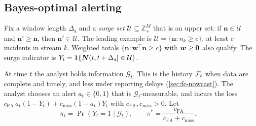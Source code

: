 \subsection{Bayes-optimal alerting}\label{sec:fc-alert}

Fix a window length $\Delta_{\mathrm a}$ and a \emph{surge set} $\mathcal U\subseteq\mathbb Z_+^M$
that is an upper set: if $\bm n\in\mathcal U$ and $\bm n'\ge\bm n$, then
$\bm n'\in\mathcal U$. The leading example is $\mathcal U=\{\bm n:n_k\ge c\}$, at least
$c$ incidents in stream $k$. Weighted totals $\{\bm n:\bm w^{\top}\bm n\ge c\}$ with
$\bm w\ge\mathbf{0}$ also qualify. The surge indicator is
$Y_t=\mathbf{1}\!\left\{\bm N(t,t+\Delta_{\mathrm a}]\in\mathcal U\right\}$.

At time $t$ the analyst holds information $\mathcal G_t$. This is the history $\mathcal{F}_t$
when data are complete and timely, and less under reporting delays
(\cref{sec:fc-nowcast}). The analyst chooses an alert $a_t\in\{0,1\}$ that is
$\mathcal G_t$-measurable, and incurs the loss
$c_{\mathrm{FA}}\,a_t(1-Y_t)+c_{\mathrm{miss}}(1-a_t)Y_t$ with
$c_{\mathrm{FA}},c_{\mathrm{miss}}>0$. Let
\[
\pi_t=\Pr(Y_t=1\mid\mathcal G_t),\qquad
\pi^*=\frac{c_{\mathrm{FA}}}{c_{\mathrm{FA}}+c_{\mathrm{miss}}} .
\]

